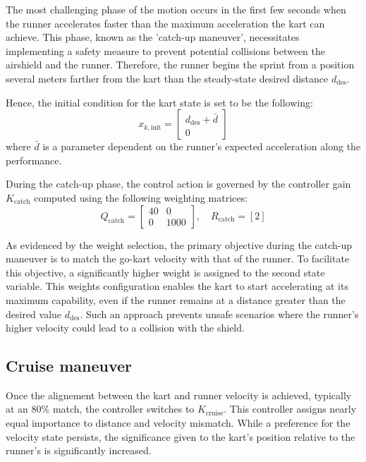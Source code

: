 \documentclass[a4paper,12pt,oneside]{book}
\begin{document}
The most challenging phase of the motion occurs in the first few seconds when the runner accelerates faster than the maximum acceleration the kart can achieve.
This phase, known as the 'catch-up maneuver', necessitates implementing a safety measure to prevent potential collisions between the airshield and the runner. 
Therefore, the runner begins the sprint from a position several meters farther from the kart than the steady-state desired distance $d_{\text{des}}$.

Hence, the initial condition for the kart state is set to be the following:
\begin{equation}
    x_{k,\text{init}} =
    \begin{bmatrix}
        d_{\text{des}} + \bar{d} \\
        0
    \end{bmatrix}
\end{equation}
where $\bar{d}$ is a parameter dependent on the runner's expected acceleration along the performance.
 

During the catch-up phase, the control action is governed by the controller gain $K_{\text{catch}}$ computed using the following weighting matrices:
\begin{equation}
    Q_{\text{catch}} =
    \begin{bmatrix}
        40 & 0 \\
        0 & 1000
    \end{bmatrix},
    \quad
    R_{\text{catch}} = [2]
\end{equation}

As evidenced by the weight selection, the primary objective during the catch-up maneuver is to match the go-kart velocity with that of the runner.
To facilitate this objective, a significantly higher weight is assigned to the second state variable.
This weights configuration enables the kart to start accelerating at its maximum capability, even if the runner remains at a distance greater than the desired value $d_{\text{des}}$.
Such an approach prevents unsafe scenarios where the runner's higher velocity could lead to a collision with the shield.

\subsection{Cruise maneuver}
Once the alignement between the kart and runner velocity is achieved, typically at an 80\% match, the controller switches to $K_{\text{cruise}}$.
This controller assigns nearly equal importance to distance and velocity mismatch.
While a preference for the velocity state persists, the significance given to the kart's position relative to the runner's is significantly increased.
\end{document}
